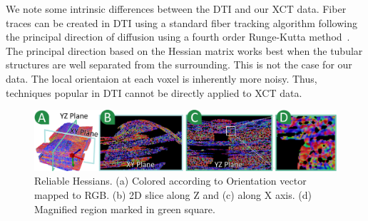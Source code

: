  
We note some intrinsic differences between the DTI and our XCT data. Fiber traces can be created in DTI using a standard fiber tracking algorithm following the principal direction of diffusion using a fourth order Runge-Kutta method~\cite{Brun2003}. The principal direction based on the Hessian matrix works best when the tubular structures are well separated from the surrounding. This is not the case for our data. The local orientaion at each voxel is inherently more noisy. Thus, techniques popular in DTI cannot be directly applied to XCT data.

%
\begin{figure}[tb]
\centering
\includegraphics[width=\linewidth]{images_pvis/reliable_hessian.pdf}
\caption{Reliable Hessians. (a) Colored according to Orientation vector mapped to RGB. (b) 2D slice along Z and (c) along X axis. (d) Magnified region marked in green square.}
\label{fig:reliable_hessian}
\end{figure}


